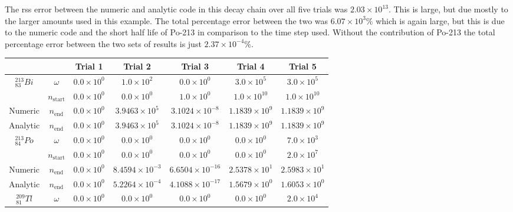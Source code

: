 The \acrshort{rss} error between the numeric and analytic code in this decay chain over all five trials was $2.03 \times 10^{13}$.  This is large, but due mostly to the larger amounts used in this example.  The total percentage error between the two was $6.07 \times 10^{3}\%$ which is again large, but this is due to the numeric code and the short half life of Po-213 in comparison to the time step used.  Without the contribution of Po-213 the total percentage error between the two sets of results is just $2.37 \times 10^{-4}\%$.


\begin{table}[h]
\begin{center}
\begin{longtable}{c c c c c c c}
\hline\hline
 &  & Trial 1 & Trial 2 & Trial 3 & Trial 4 & Trial 5 \\
\hline\hline
${}^{213}_{83}Bi$ & $\omega$ & 
${0.0} \times 10^{0}$ & ${1.0} \times 10^{2}$ & ${0.0} \times 10^{0}$ &
${3.0} \times 10^{5}$ & ${3.0} \times 10^{5}$ \\
 & $n_{\text{start}}$ & 
${0.0} \times 10^{0}$ & ${0.0} \times 10^{0}$ & ${1.0} \times 10^{0}$ & 
${1.0} \times 10^{10}$ & ${1.0} \times 10^{10}$ \\
Numeric & $n_{\text{end}}$ & 
${0.0} \times 10^{0}$ & ${3.9463} \times 10^{5}$ & ${3.1024} \times 10^{-8}$ & 
${1.1839} \times 10^{9}$ & ${1.1839} \times 10^{9}$ \\
Analytic & $n_{\text{end}}$ & 
${0.0} \times 10^{0}$ & ${3.9463} \times 10^{5}$ & ${3.1024} \times 10^{-8}$ & 
${1.1839} \times 10^{9}$ & ${1.1839} \times 10^{9}$ \\
\hline$
{}^{213}_{84}Po$ & $\omega$ & 
${0.0} \times 10^{0}$ & ${0.0} \times 10^{0}$ & ${0.0} \times 10^{0}$ &
${0.0} \times 10^{0}$ & ${7.0} \times 10^{3}$ \\
 & $n_{\text{start}}$ & 
${0.0} \times 10^{0}$ & ${0.0} \times 10^{0}$ & ${0.0} \times 10^{0}$ &
${0.0} \times 10^{0}$ & ${2.0} \times 10^{7}$ \\
Numeric & $n_{\text{end}}$ & 
${0.0} \times 10^{0}$ & ${8.4594} \times 10^{-3}$ & ${6.6504} \times 10^{-16}$ & 
${2.5378} \times 10^{1}$ & ${2.5983} \times 10^{1}$ \\
Analytic & $n_{\text{end}}$ & 
${0.0} \times 10^{0}$ & ${5.2264} \times 10^{-4}$ & ${4.1088} \times 10^{-17}$ & 
${1.5679} \times 10^{0}$ & ${1.6053} \times 10^{0}$ \\
\hline
${}^{209}_{81}Tl$ & $\omega$ & 
${0.0} \times 10^{0}$ & ${0.0} \times 10^{0}$ & ${0.0} \times 10^{0}$ &
${0.0} \times 10^{0}$ & ${2.0} \times 10^{4}$ \\

\end{longtable}
\end{center}
\end{table}
